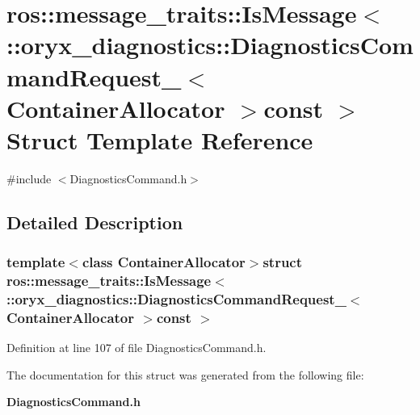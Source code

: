 \section{ros\-:\-:message\-\_\-traits\-:\-:\-Is\-Message$<$ \-:\-:oryx\-\_\-diagnostics\-:\-:\-Diagnostics\-Command\-Request\-\_\-$<$ \-Container\-Allocator $>$const $>$ \-Struct \-Template \-Reference}
\label{structros_1_1message__traits_1_1IsMessage_3_01_1_1oryx__diagnostics_1_1DiagnosticsCommandRequestf70e705fa0414ab05309f8fb420be6e8}


{\ttfamily \#include $<$\-Diagnostics\-Command.\-h$>$}



\subsection{\-Detailed \-Description}
\subsubsection*{template$<$class Container\-Allocator$>$struct ros\-::message\-\_\-traits\-::\-Is\-Message$<$ \-::oryx\-\_\-diagnostics\-::\-Diagnostics\-Command\-Request\-\_\-$<$ Container\-Allocator $>$const  $>$}



\-Definition at line 107 of file \-Diagnostics\-Command.\-h.



\-The documentation for this struct was generated from the following file\-:\begin{DoxyCompactItemize}
\item 
{\bf \-Diagnostics\-Command.\-h}\end{DoxyCompactItemize}
